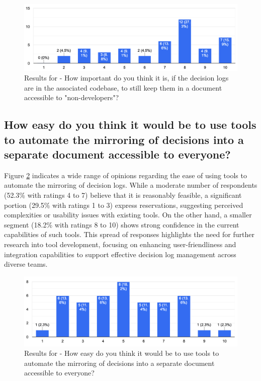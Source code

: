 \begin{figure}[h!]
\centering
\includegraphics[width=\linewidth]{Images/Survey/decisions_4.png}
\caption{Results for - How important do you think it is, if the decision logs are in the associated codebase, to still keep them in a document accessible to "non-developers"?}
\label{fig:results:decisions:4}
\end{figure}

\pagebreak


\subsection*{How easy do you think it would be to use tools to automate the mirroring of decisions into a separate document accessible to everyone?}
Figure \ref{fig:results:decisions:5} indicates a wide range of opinions regarding the ease of using tools to automate the mirroring of decision logs. While a moderate number of respondents (52.3\% with ratings 4 to 7) believe that it is reasonably feasible, a significant portion (29.5\% with ratings 1 to 3) express reservations, suggesting perceived complexities or usability issues with existing tools. On the other hand, a smaller segment (18.2\% with ratings 8 to 10) shows strong confidence in the current capabilities of such tools. This spread of responses highlights the need for further research into tool development, focusing on enhancing user-friendliness and integration capabilities to support effective decision log management across diverse teams.

\begin{figure}[h!]
\centering
\includegraphics[width=\linewidth]{Images/Survey/decisions_5.png}
\caption{Results for - How easy do you think it would be to use tools to automate the mirroring of decisions into a separate document accessible to everyone?}
\label{fig:results:decisions:5}
\end{figure}

